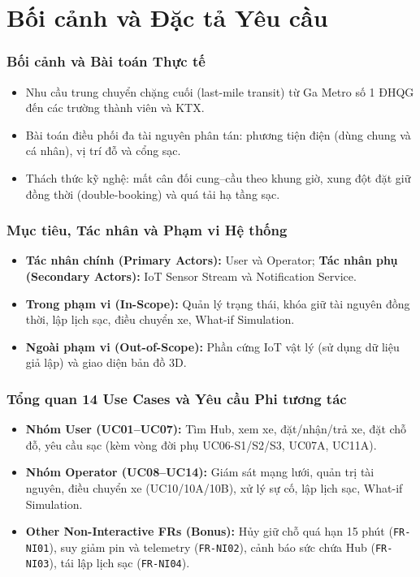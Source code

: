 \section{Bối cảnh và Đặc tả Yêu cầu}

\begin{frame}
\frametitle{Bối cảnh và Bài toán Thực tế}
\begin{itemize}
    \item Nhu cầu trung chuyển chặng cuối (last-mile transit) từ Ga Metro số 1 ĐHQG đến các trường thành viên và KTX.
    \item Bài toán điều phối đa tài nguyên phân tán: phương tiện điện (dùng chung và cá nhân), vị trí đỗ và cổng sạc.
    \item Thách thức kỹ nghệ: mất cân đối cung--cầu theo khung giờ, xung đột đặt giữ đồng thời (double-booking) và quá tải hạ tầng sạc.
\end{itemize}
\end{frame}

\begin{frame}
\frametitle{Mục tiêu, Tác nhân và Phạm vi Hệ thống}
\begin{itemize}
    \item \textbf{Tác nhân chính (Primary Actors):} User và Operator; \textbf{Tác nhân phụ (Secondary Actors):} IoT Sensor Stream và Notification Service.
    \item \textbf{Trong phạm vi (In-Scope):} Quản lý trạng thái, khóa giữ tài nguyên đồng thời, lập lịch sạc, điều chuyển xe, What-if Simulation.
    \item \textbf{Ngoài phạm vi (Out-of-Scope):} Phần cứng IoT vật lý (sử dụng dữ liệu giả lập) và giao diện bản đồ 3D.
\end{itemize}
\end{frame}

\begin{frame}
\frametitle{Tổng quan 14 Use Cases và Yêu cầu Phi tương tác}
\begin{itemize}
    \item \textbf{Nhóm User (UC01--UC07):} Tìm Hub, xem xe, đặt/nhận/trả xe, đặt chỗ đỗ, yêu cầu sạc (kèm vòng đời phụ UC06-S1/S2/S3, UC07A, UC11A).
    \item \textbf{Nhóm Operator (UC08--UC14):} Giám sát mạng lưới, quản trị tài nguyên, điều chuyển xe (UC10/10A/10B), xử lý sự cố, lập lịch sạc, What-if Simulation.
    \item \textbf{Other Non-Interactive FRs (Bonus):} Hủy giữ chỗ quá hạn 15 phút (\texttt{FR-NI01}), suy giảm pin và telemetry (\texttt{FR-NI02}), cảnh báo sức chứa Hub (\texttt{FR-NI03}), tái lập lịch sạc (\texttt{FR-NI04}).
\end{itemize}
\end{frame}


